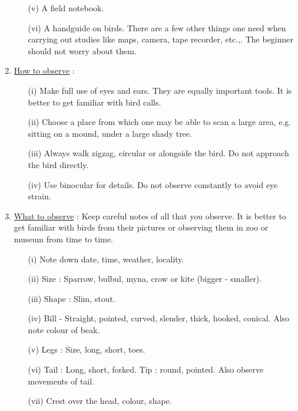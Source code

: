 \begin{enumerate}
\begin{itemize}
\item[(v)] A field notebook. 

\item[(vi)] A handguide on birds. There are a few other things one 
need when carrying out studies like maps, camera, tape 
recorder, etc.,. The beginner should not worry about 
them. 
\end{itemize}

\item \underline{How to observe} :
\begin{itemize}
\item[(i)] Make full use of eyes and ears. They are equally important 
tools. It is better to get familiar with bird calls. 

\item[(ii)] Choose a place from which one may be able to scan a 
large area, e.g. sitting on a mound, under a large 
shady tree. 

\item[(iii)] Always walk zigzag, circular or alongside the bird. Do 
not approach the bird directly. 

\item[(iv)] Use binocular for details. Do not observe constantly to 
avoid eye strain. 
\end{itemize}

\item \underline{What to observe} : Keep careful notes of all that you observe. 
It is better to get familiar with birds from their 
pictures or observing them in zoo or museum from time to 
time. 
\begin{itemize}
\item[(i)] Note down date, time, weather, locality. 

\item[(ii)] Size  : Sparrow, bulbul, myna, crow or kite 
(bigger - smaller). 

\item[(iii)] Shape : Slim, stout. 

\item[(iv)] Bill - Straight, pointed, curved, slender, thick, 
hooked, conical. Also note colour of beak.

\item[(v)] Legs : Size, long, short, toes. 

\item[(vi)] Tail : Long, short, forked. Tip : round, pointed. Also 
observe movements of tail. 

\item[(vii)] Crest over the head, colour, shape. 


\end{itemize}
\end{enumerate}
